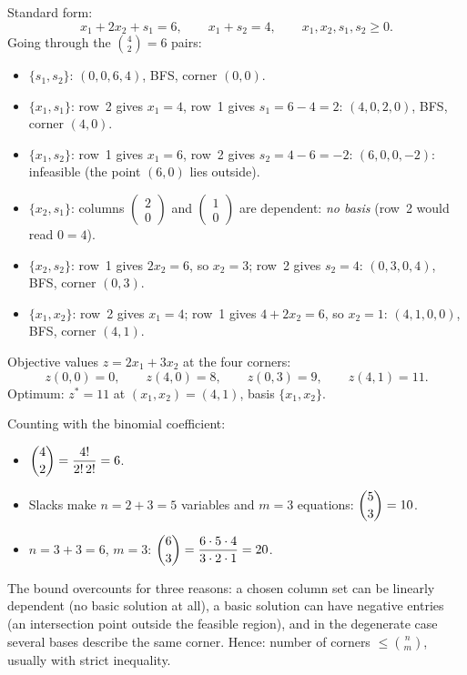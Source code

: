 \begin{solutions}
  \item Standard form:
        \[
          x_{1}+2x_{2}+s_{1}=6,\qquad
          x_{1}+s_{2}=4,\qquad
          x_{1},x_{2},s_{1},s_{2}\ge 0 .
        \]
        Going through the $\binom{4}{2}=6$ pairs:
        \begin{itemize}[leftmargin=1.8em,itemsep=0.3ex]
          \item $\{s_{1},s_{2}\}$: $(0,0,6,4)$, BFS, corner $(0,0)$.
          \item $\{x_{1},s_{1}\}$: row~2 gives $x_{1}=4$, row~1 gives
                $s_{1}=6-4=2$: $(4,0,2,0)$, BFS, corner $(4,0)$.
          \item $\{x_{1},s_{2}\}$: row~1 gives $x_{1}=6$, row~2 gives
                $s_{2}=4-6=-2$: $(6,0,0,-2)$: infeasible (the point
                $(6,0)$ lies outside).
          \item $\{x_{2},s_{1}\}$: columns
                $\begin{pmatrix}2\\0\end{pmatrix}$ and
                $\begin{pmatrix}1\\0\end{pmatrix}$ are dependent:
                \emph{no basis} (row~2 would read $0=4$).
          \item $\{x_{2},s_{2}\}$: row~1 gives $2x_{2}=6$, so $x_{2}=3$;
                row~2 gives $s_{2}=4$: $(0,3,0,4)$, BFS, corner
                $(0,3)$.
          \item $\{x_{1},x_{2}\}$: row~2 gives $x_{1}=4$; row~1 gives
                $4+2x_{2}=6$, so $x_{2}=1$: $(4,1,0,0)$, BFS, corner
                $(4,1)$.
        \end{itemize}
        Objective values $z=2x_{1}+3x_{2}$ at the four corners:
        \[
          z(0,0)=0,\qquad z(4,0)=8,\qquad z(0,3)=9,\qquad z(4,1)=11 .
        \]
        Optimum: $z^{*}=11$ at $(x_{1},x_{2})=(4,1)$, basis
        $\{x_{1},x_{2}\}$.

  \item Counting with the binomial coefficient:
        \begin{itemize}[leftmargin=1.8em,itemsep=0.3ex]
          \item[(a)] $\dbinom{4}{2}=\dfrac{4!}{2!\,2!}=6$.
          \item[(b)] Slacks make $n=2+3=5$ variables and $m=3$ equations:
                $\dbinom{5}{3}=10$.
          \item[(c)] $n=3+3=6$, $m=3$:
                $\dbinom{6}{3}=\dfrac{6\cdot 5\cdot 4}{3\cdot 2\cdot 1}
                =20$.
        \end{itemize}
        The bound overcounts for three reasons: a chosen column set can be
        linearly dependent (no basic solution at all), a basic solution
        can have negative entries (an intersection point outside the
        feasible region), and in the degenerate case several bases
        describe the same corner. Hence: number of corners
        $\le\binom{n}{m}$, usually with strict inequality.


\end{solutions}

